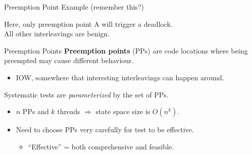 \documentclass[xcolor=dvipsnames]{beamer}
\begin{document}
\begin{frame}{Preemption Point Example (remember this?)}
	\linegap

	Here, only preemption point A will trigger a deadlock. {\bf ~}\\
	All other interleavings are benign.{\bf ~}

\end{frame}

\begin{frame}{Preemption Points}
	\textbf{Preemption points} (PPs) are code locations where being preempted may cause different behaviour.
	\begin{itemize}
		\item IOW, somewhere that interesting interleavings can happen around.
	\end{itemize}
	\linegap

	Systematic tests are {\em parameterized} by the set of PPs.
	\begin{itemize}
		\item $n$ PPs and $k$ threads $\Rightarrow$ state space size is $O(n^k)$.
		\item Need to choose PPs very carefully for test to be effective.
		\begin{itemize}
			\item ``Effective'' = both comprehensive and feasible.
		\end{itemize}
	\end{itemize}
\end{frame}
\end{document}
